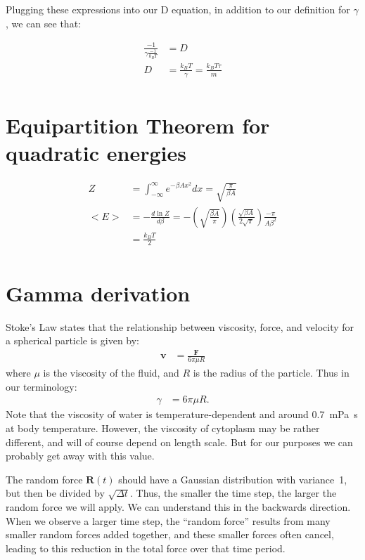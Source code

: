 \documentclass[10pt]{article} %
\begin{document}
Plugging these expressions into our D equation, in addition to our definition for $\gamma$, we can see that:

\begin{align*}
  \frac{-1}{\gamma\frac{-1}{k_BT}} &= D\\
  D &= \frac{k_BT}{\gamma} = \frac{k_BT\tau}{m}\\
\end{align*}

\section{Equipartition Theorem for quadratic energies}
\begin{align*}
  Z &= \int_{-\infty}^{\infty} e^{-\beta Ax^2}dx = \sqrt{\frac{\pi}{\beta A}}\\
  <E> &= - \frac{d\ln Z}{d\beta} = -\left(\sqrt{\frac{\beta A}{\pi}}\right)\left(\frac{\sqrt{\beta A}}{2\sqrt{\pi}}\right)\frac{-\pi}{A\beta^2}\\
  &= \frac{k_BT}{2}\\
\end{align*}

\section{Gamma derivation}

Stoke's Law states that the relationship between viscosity, force, and
velocity for a spherical particle is given by:
\begin{align}
  \mathbf{v} &= \frac{\mathbf{F}}{6\pi \mu R}
\end{align}
where $\mu$ is the viscosity of the fluid, and $R$ is the radius of
the particle.  Thus in our terminology:
\begin{align}
  \gamma &= 6\pi \mu R.
\end{align}
Note that the viscosity of water is temperature-dependent and around
0.7~mPa~s at body temperature.  However, the viscosity of cytoplasm
may be rather different, and will of course depend on length scale.
But for our purposes we can probably get away with this value.

The random force $\mathbf{R}(t)$ should have a Gaussian distribution
with variance~1, but then be divided by $\sqrt{\Delta t}$.  Thus, the
smaller the time step, the larger the random force we will apply.  We
can understand this in the backwards direction.  When we observe a
larger time step, the ``random force'' results from many smaller
random forces added together, and these smaller forces often cancel,
leading to this reduction in the total force over that time period.
\end{document}
